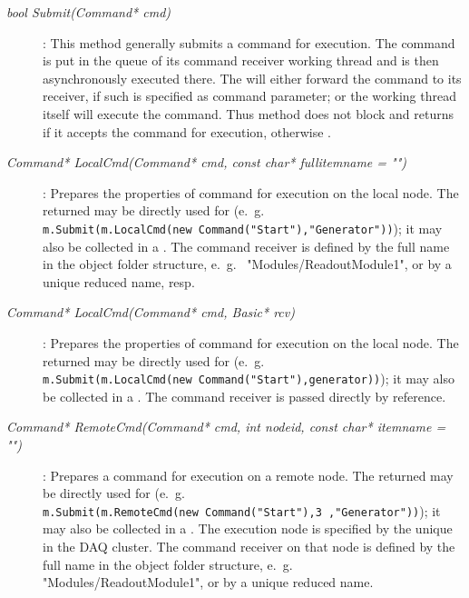 \begin{description}
 
\item[\em bool Submit\small (Command* cmd)] :
This method generally submits a command  for execution.
The command is put in the queue of its command receiver working thread and is
then asynchronously executed there. The  will either forward the command
to its receiver, if such is specified as command parameter; or the  working thread itself will execute the command.
Thus method does not block and returns  if it accepts the command for execution, otherwise . 
      
\item[\em Command* LocalCmd\small (Command* cmd, const char* fullitemname = "")] :
Prepares the properties of command  for execution on the local node. The
returned  may be directly used for 
(e.~g.~ \\ {\tt m.Submit(m.LocalCmd(new Command("Start"),"Generator"))});
it may also be collected in a .
The command receiver is defined by the full name  in the object folder structure, e.~g.~ "Modules/ReadoutModule1", or by a unique reduced name, resp.

\item[\em Command* LocalCmd\small (Command* cmd, Basic* rcv)] :
Prepares the properties of command  for execution on the local node. The
returned  may be directly used for 
(e.~g.~ \\ {\tt m.Submit(m.LocalCmd(new Command("Start"),generator))});
it may also be collected in a .
The command receiver  is passed directly by reference.


\item[\em Command* RemoteCmd(Command* cmd, int nodeid, const char* itemname = "")] :
Prepares a command  for execution on a remote node. 
The returned  may be directly used for 
(e.~g.~ \\ {\tt m.Submit(m.RemoteCmd(new Command("Start"),3 ,"Generator"))});
it may also be collected in a .
The execution node is specified by the unique  in the DAQ
cluster. The command receiver on that node
is defined by the full name  in the object folder structure,
e.~g.~ "Modules/ReadoutModule1", or by a unique reduced name.



\end{description}
